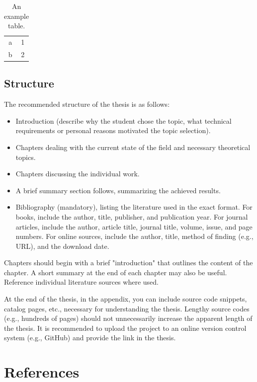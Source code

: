 \documentclass[12pt, a4paper, titlepage, onehalfspacing]{report}
\begin{document}
\begin{table}
    \centering
    \begin{tabular}{c|c}
       a  & 1 \\
        b & 2
    \end{tabular}
    \caption{An example table.}
    \label{tab:pelda}
\end{table}

\section{Structure}
The recommended structure of the thesis is as follows:

\begin{itemize}
    \item Introduction (describe why the student chose the topic, what technical requirements or personal reasons motivated the topic selection).
    \item Chapters dealing with the current state of the field and necessary theoretical topics.
    \item Chapters discussing the individual work.
    \item A brief summary section follows, summarizing the achieved results.
    \item Bibliography (mandatory), listing the literature used in the exact format. For books, include the author, title, publisher, and publication year. For journal articles, include the author, article title, journal title, volume, issue, and page numbers. For online sources, include the author, title, method of finding (e.g., URL), and the download date.
\end{itemize}

Chapters should begin with a brief "introduction" that outlines the content of the chapter. A short summary at the end of each chapter may also be useful. Reference individual literature sources where used.

At the end of the thesis, in the appendix, you can include source code snippets, catalog pages, etc., necessary for understanding the thesis. Lengthy source codes (e.g., hundreds of pages) should not unnecessarily increase the apparent length of the thesis. It is recommended to upload the project to an online version control system (e.g., GitHub) and provide the link in the thesis.

\chapter{References}
\end{document}
